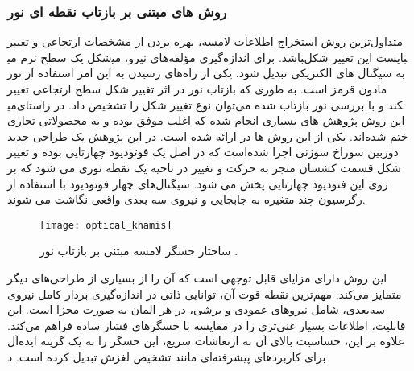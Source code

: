\subsubsection{روش های مبتنی بر بازتاب نقطه ای نور}
متداول‌ترین روش استخراج اطلاعات لامسه، بهره بردن از مشخصات ارتجاعی و تغییر شکل یک سطح نرم می‎باشد. برای اندازه‌گیری مؤلفه‌های نیرو، می‎بایست این تغییر شکل به سیگنال های الکتریکی تبدیل شود. یکی از راه‌های رسیدن به این امر استفاده از نور مادون قرمز است. به طوری که بازتاب نور در اثر تغییر شکل سطح ارتجاعی تغییر می‎کند و با بررسی نور بازتاب‌ شده می‌توان نوع تغییر شکل را تشخیص داد. در راستای این روش پژوهش های بسیاری انجام شده که اغلب موفق بوده و به محصولاتی تجاری ختم شده‌اند. یکی از این روش ها در 
\cite{khamis_novel_2019}
ارائه شده است. در این پژوهش یک طراحی جدید دوربین سوراخ سوزنی
 اجرا شده‌است که در اصل یک فوتودیود چهارتایی
  بوده و تغییر شکل قسمت کشسان منجر به حرکت و تغییر در ناحیه یک نقطه نوری می شود که بر روی این فتودیود چهارتایی پخش می شود. سیگنال‌های چهار فوتودیود با استفاده از رگرسیون چند متغیره به جابجایی و نیروی سه بعدی واقعی نگاشت می شوند. 
  \begin{figure}[t]
  	\centering
  	\texttt{[image: optical\_khamis]}
  	\caption{ساختار حسگر لامسه مبتنی بر بازتاب نور
  		\cite{khamis_novel_2019}.}
  	\label{fig:optical_khamis}
  \end{figure}
این روش دارای مزایای قابل توجهی است که آن را از بسیاری از طراحی‌های دیگر متمایز می‌کند. مهم‌ترین نقطه قوت آن، توانایی ذاتی در اندازه‌گیری بردار کامل نیروی سه‌بعدی، شامل نیروهای عمودی و برشی، در هر المان
 به صورت مجزا است. این قابلیت، اطلاعات بسیار غنی‌تری را در مقایسه با حسگرهای فشار ساده فراهم می‌کند. علاوه بر این، حساسیت بالای آن به ارتعاشات سریع، این حسگر را به یک گزینه ایده‌آل برای کاربردهای پیشرفته‌ای مانند تشخیص لغزش تبدیل کرده است. د

